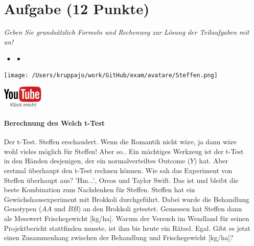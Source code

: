 \documentclass[a4paper, 9pt]{scrartcl}\usepackage[]{graphicx}\usepackage[]{xcolor}
\begin{document}
\section{Aufgabe \hfill (12 Punkte)}

\textit{Geben Sie grundsätzlich Formeln und Rechenweg zur Lösung der Teilaufgaben mit an!} \\[1Ex]
 

 
\ifcollection
\begin{flushright}
\tiny\vspace{-3Ex}
\textbf{\examinhaltstart}
\exammodulemathstat $\;\bullet$
\exammodulestat $\;\bullet$
\exammodulestatbbv 
\vspace{-4Ex}
\end{flushright}
\begin{minipage}[t]{0.5\textwidth}
\texttt{[image: /Users/kruppajo/work/GitHub/exam/avatare/Steffen.png]}
\end{minipage}
\begin{minipage}[t]{0.5\textwidth}
\hfill
\href{https://youtu.be/TbSEOMCQYl4}{\includegraphics[width = 2cm]{img/youtube}}
\end{minipage}
\vspace{-3ex}
\fi



\ifcollection
\paragraph{Berechnung des Welch t-Test}
\fi


Der t-Test. Steffen erschaudert. Wenn die Romantik nicht wäre, ja dann wäre wohl vieles möglich für Steffen! Aber so.. Ein mächtiges Werkzeug ist der t-Test in den Händen desjenigen, der ein normalverteiltes Outcome ($Y$) hat. Aber erstmal überhaupt den t-Test rechnen können. Wie sah das Experiment von Steffen überhaupt aus? 'Hm...', Oreos und Taylor Swift. Das ist und bleibt die beste Kombination zum Nachdenken für Steffen. Steffen hat ein Gewächshausexperiment mit Brokkoli durchgeführt. Dabei wurde die Behandlung Genotypen ($AA$ und $BB$) an den Brokkoli getestet. Gemessen hat Steffen dann als Messwert Frischegewicht [kg/ha]. Warum der Versuch im Wendland für seinen Projektbericht stattfinden musste, ist ihm bis heute ein Rätsel. Egal. Gibt es jetzt einen Zusammenhang zwischen der Behandlung und Frischegewicht [kg/ha]?
\end{document}
